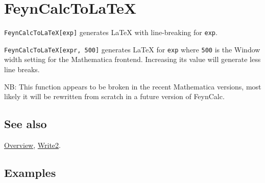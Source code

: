 \documentclass[../FeynCalcManual.tex]{subfiles}
\begin{document}
\hypertarget{feyncalctolatex}{
\section{FeynCalcToLaTeX}\label{feyncalctolatex}}

\texttt{FeynCalcToLaTeX[\allowbreak{}exp]} generates LaTeX with
line-breaking for \texttt{exp}.

\texttt{FeynCalcToLaTeX[\allowbreak{}expr,\ \allowbreak{}500]} generates
LaTeX for \texttt{exp} where \texttt{500} is the Window width setting
for the Mathematica frontend. Increasing its value will generate less
line breaks.

NB: This function appears to be broken in the recent Mathematica
versions, most likely it will be rewritten from scratch in a future
version of FeynCalc.

\subsection{See also}

\hyperlink{toc}{Overview}, \hyperlink{write2}{Write2}.

\subsection{Examples}
\end{document}
